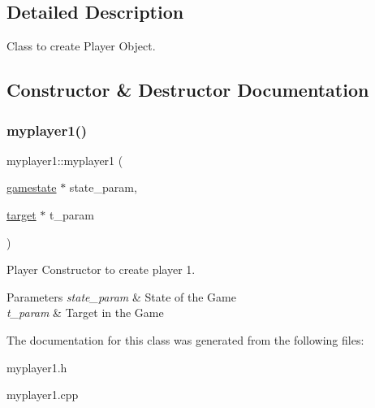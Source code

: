\subsection{Detailed Description}
Class to create Player Object. 

\subsection{Constructor \& Destructor Documentation}
\mbox{\label{classmyplayer1_a432fa3b50d94486945e6632035fdb79c}} 
\subsubsection{\texorpdfstring{myplayer1()}{myplayer1()}}
{\footnotesize\ttfamily myplayer1\+::myplayer1 (\begin{DoxyParamCaption}\item[{\hyperlink{classgamestate}{gamestate} $\ast$}]{state\+\_\+param,  }\item[{\hyperlink{classtarget}{target} $\ast$}]{t\+\_\+param }\end{DoxyParamCaption})}



Player Constructor to create player 1. 


\begin{DoxyParams}{Parameters}
{\em state\+\_\+param} & State of the Game \\
\hline
{\em t\+\_\+param} & Target in the Game \\
\hline
\end{DoxyParams}


The documentation for this class was generated from the following files\+:\begin{DoxyCompactItemize}
\item 
myplayer1.\+h\item 
myplayer1.\+cpp\end{DoxyCompactItemize}
